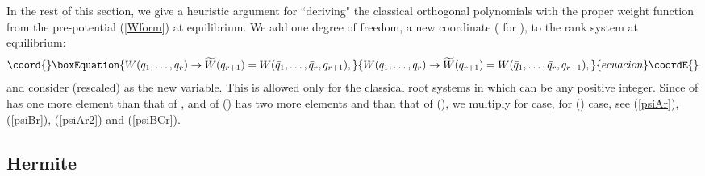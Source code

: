 \documentclass[a4paper,12pt]{article}
\begin{document}
In the rest of this section, we give a heuristic argument for ``deriving"
the classical orthogonal polynomials  with the proper weight function from
the pre-potential \coordHE{} (\ref{Wform}) at equilibrium. We add one degree of
freedom, a new coordinate \coordHE{} (\coordHE{} for \coordHE{}), to the rank \coordHE{}
system at equilibrium:
\begin{equation}\coord{}\boxEquation{
   W(q_1,\ldots,q_r)\to
   \widetilde{W}(q_{r+1})=W(\bar{q}_1,\ldots,\bar{q}_r,q_{r+1}),
   \label{wtilde}
}{
   W(q_1,\ldots,q_r)\to
   \widetilde{W}(q_{r+1})=W(\bar{q}_1,\ldots,\bar{q}_r,q_{r+1}),
   }{ecuacion}\coordE{}\end{equation}
and consider (rescaled) \coordHE{} as the new variable. This is allowed
only for the classical root systems in which \coordHE{} can be any positive integer.
Since \coordHE{} of \coordHE{} has one more element \coordHE{} than that 
of \coordHE{}, and \coordHE{} of \coordHE{} (\coordHE{}) has two more 
elements \coordHE{} and \coordHE{} than that of \coordHE{} (\coordHE{}),
we multiply \coordHE{} for \coordHE{} case,
\coordHE{} for \coordHE{} (\coordHE{}) case,
see (\ref{psiAr}), (\ref{psiBr}), (\ref{psiAr2}) and (\ref{psiBCr}).

\subsection{Hermite}
\end{document}
